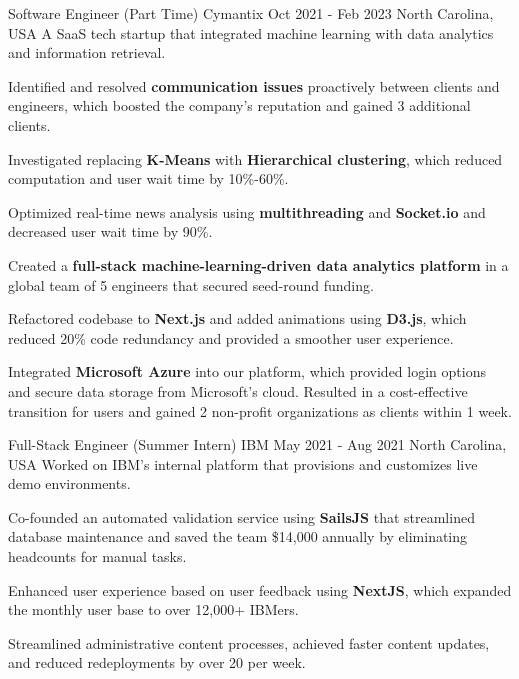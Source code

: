 \begin{cventries}
    \cventry
    {Software Engineer (Part Time)} %
    {Cymantix} %
    {Oct 2021 - Feb 2023} %
    {North Carolina, USA} %
    {A SaaS tech startup that integrated machine learning with data analytics and information retrieval.}
    {
      \begin{cvitems} %
        \item {Identified and resolved \textbf{communication issues} proactively between clients and engineers, which boosted the company's reputation and gained 3 additional clients.}
        \item {Investigated replacing \textbf{K-Means} with \textbf{Hierarchical clustering}, which reduced computation and user wait time by 10\%-60\%.}
        \item {Optimized real-time news analysis using \textbf{multithreading} and \textbf{Socket.io} and decreased user wait time by 90\%.}
        \item {Created a \textbf{full-stack machine-learning-driven data analytics platform} in a global team of 5 engineers that secured seed-round funding.}
        \item {Refactored codebase to \textbf{Next.js} and added animations using \textbf{D3.js}, which reduced 20\% code redundancy and provided a smoother user experience.}
        \item {Integrated \textbf{Microsoft Azure} into our platform, which provided login options and secure data storage from Microsoft's cloud. Resulted in a cost-effective transition for users and gained 2 non-profit organizations as clients within 1 week.}
      \end{cvitems}
    }

    \cventry
    {Full-Stack Engineer (Summer Intern)} %
    {IBM} %
    {May 2021 - Aug 2021} %
    {North Carolina, USA} %
    {Worked on IBM's internal platform that provisions and customizes live demo environments.}
    {
      \begin{cvitems} %
        \item {Co-founded an automated validation service using \textbf{SailsJS} that streamlined database maintenance and saved the team \$14,000 annually by eliminating headcounts for manual tasks.}
        \item {Enhanced user experience based on user feedback using \textbf{NextJS}, which expanded the monthly user base to over 12,000+ IBMers.}
        \item {Streamlined administrative content processes, achieved faster content updates, and reduced redeployments by over 20 per week.}
      \end{cvitems}
    }


\end{cventries}
